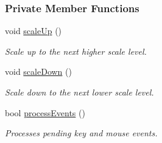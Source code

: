 \subsubsection*{Private Member Functions}
\begin{DoxyCompactItemize}
\item 
void \hyperlink{structslb_1_1core_1_1ui_1_1Visualizer_a82ba6d4d4e423c6835875f104354002b}{scale\+Up} ()\hypertarget{structslb_1_1core_1_1ui_1_1Visualizer_a82ba6d4d4e423c6835875f104354002b}{}\label{structslb_1_1core_1_1ui_1_1Visualizer_a82ba6d4d4e423c6835875f104354002b}

\begin{DoxyCompactList}\small\item\em Scale up to the next higher scale level. \end{DoxyCompactList}\item 
void \hyperlink{structslb_1_1core_1_1ui_1_1Visualizer_a8d51e81d494b62de3f8340ff5b76edb7}{scale\+Down} ()\hypertarget{structslb_1_1core_1_1ui_1_1Visualizer_a8d51e81d494b62de3f8340ff5b76edb7}{}\label{structslb_1_1core_1_1ui_1_1Visualizer_a8d51e81d494b62de3f8340ff5b76edb7}

\begin{DoxyCompactList}\small\item\em Scale down to the next lower scale level. \end{DoxyCompactList}\item 
bool \hyperlink{structslb_1_1core_1_1ui_1_1Visualizer_a159e5fd9906e92d7b24f11bfc819f12e}{process\+Events} ()
\begin{DoxyCompactList}\small\item\em Processes pending key and mouse events. \end{DoxyCompactList}\end{DoxyCompactItemize}
